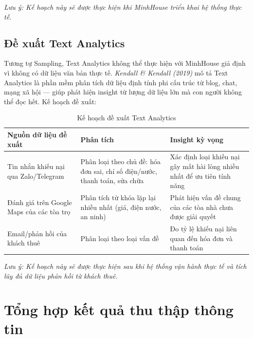 \documentclass[12pt,a4paper]{report}
\begin{document}
\emph{Lưu ý: Kế hoạch này sẽ được thực hiện khi MinhHouse triển khai hệ thống thực tế.}

\subsection{Đề xuất Text Analytics}

Tương tự Sampling, Text Analytics không thể thực hiện với MinhHouse giả định vì không có dữ liệu văn bản thực tế. \emph{Kendall \& Kendall (2019)} mô tả Text Analytics là phần mềm phân tích dữ liệu định tính phi cấu trúc từ blog, chat, mạng xã hội --- giúp phát hiện insight từ lượng dữ liệu lớn mà con người không thể đọc hết. Kế hoạch đề xuất:

\begin{table}[H]
  \centering
  \caption{Kế hoạch đề xuất Text Analytics}
  \label{tab:ig_textanalytics}
  \begin{tabular}{@{}p{4.4cm}p{4.6cm}p{5cm}@{}}
    \toprule
    \textbf{Nguồn dữ liệu đề xuất} & \textbf{Phân tích} & \textbf{Insight kỳ vọng} \\
    \midrule
    Tin nhắn khiếu nại qua Zalo/Telegram & Phân loại theo chủ đề: hóa đơn sai, chỉ số điện/nước, thanh toán, sửa chữa & Xác định loại khiếu nại gây mất hài lòng nhiều nhất để ưu tiên tính năng \\
    \addlinespace
    Đánh giá trên Google Maps của các tòa trọ & Phân tích từ khóa lặp lại nhiều nhất (giá, điện nước, an ninh) & Phát hiện vấn đề chung của các tòa nhà chưa được giải quyết \\
    \addlinespace
    Email/phản hồi của khách thuê & Phân loại theo loại vấn đề & Đo tỷ lệ khiếu nại liên quan đến hóa đơn và thanh toán \\
    \bottomrule
  \end{tabular}
\end{table}

\emph{Lưu ý: Kế hoạch này sẽ được thực hiện sau khi hệ thống vận hành thực tế và tích lũy đủ dữ liệu phản hồi từ khách thuê.}

\section{Tổng hợp kết quả thu thập thông tin}
\end{document}
